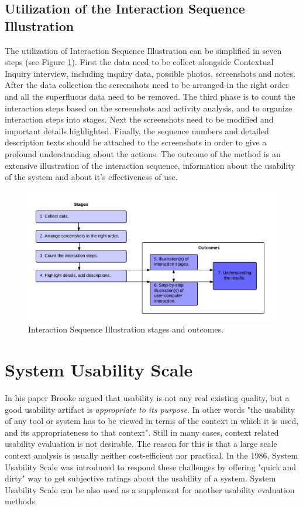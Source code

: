 \documentclass[12pt,a4paper,oneside,pdftex]{report}
\begin{document}
\subsection{Utilization of the Interaction Sequence Illustration}
The utilization of Interaction Sequence Illustration can be simplified in seven steps (see Figure \ref{fig:isi_chart}). First the data need to be collect alongside Contextual Inquiry interview, including inquiry data, possible photos, screenshots and notes.
After the data collection the screenshots need to be arranged in the right order and all the superfluous data need to be removed. The third phase is to count the interaction steps based on the screenshots and activity analysis, and to organize interaction steps into stages.
Next the screenshots need to be modified and important details highlighted. Finally, the sequence numbers and  detailed description texts should be attached to the screenshots in order to give a profound understanding about the actions. The outcome of the method is an extensive illustration of the interaction sequence, information about the usability of the system and about it's effectiveness of use. \cite{RefWorks:17}
	
\begin{figure}[H]
  	\centering
  	\includegraphics[width=1.1\textwidth]{./images/isi_chart.png}
  	\caption{Interaction Sequence Illustration stages and outcomes.}
	\label{fig:isi_chart}
\end{figure}

\section{System Usability Scale}
\label{sec:sus}
In his paper Brooke \cite{RefWorks:10} argued that usability is not any real existing quality, but a good usability artifact is \emph{appropriate to its purpose}. In other words "the usability of any tool or system has to be viewed in terms of the context in which it is 			used, and its appropriateness to that context"\cite{RefWorks:10}. Still in many cases, context related usability evaluation is not desirable. The reason for this is that a large scale context analysis is usually neither cost-efficient nor practical.\cite{RefWorks:10} In the 1986, System Usability Scale was introduced to respond these challenges by offering "quick and dirty"\cite{RefWorks:10} way to get subjective ratings about the usability of a system. \cite{RefWorks:12, RefWorks:35} System Usability Scale can be also used as a supplement for another usability evaluation methods.
\end{document}
